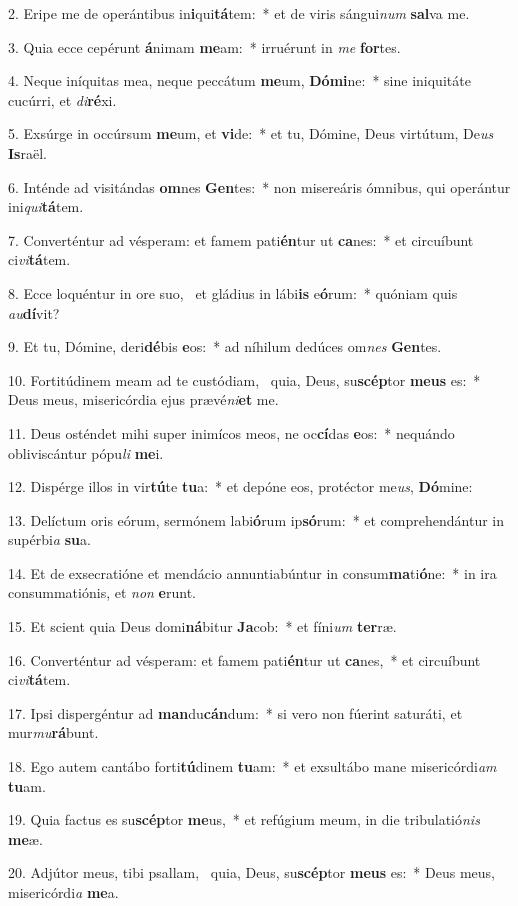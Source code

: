 2. Eripe me de operántibus in\textbf{i}qui\textbf{tá}tem:~*  et de viris sángui\textit{num} \textbf{sal}va me.\

3. Quia ecce cepérunt \textbf{á}nimam \textbf{me}am:~*  irruérunt in \textit{me} \textbf{for}tes.\

4. Neque iníquitas mea, neque peccátum \textbf{me}um, \textbf{Dó}\textbf{mi}ne:~*  sine iniquitáte cucúrri, et \textit{di}\textbf{ré}xi.\

5. Exsúrge in occúrsum \textbf{me}um, et \textbf{vi}de:~*  et tu, Dómine, Deus virtútum, De\textit{us} \textbf{Is}raël.\

6. Inténde ad visitándas \textbf{om}nes \textbf{Gen}tes:~*  non misereáris ómnibus, qui operántur ini\textit{qui}\textbf{tá}tem.\

7. Converténtur ad vésperam: et famem pati\textbf{én}tur ut \textbf{ca}nes:~*  et circuíbunt ci\textit{vi}\textbf{tá}tem.\

8. Ecce loquéntur in ore suo, \dag\  et gládius in lábi\textbf{is} e\textbf{ó}rum:~*  quóniam quis \textit{au}\textbf{dí}vit?\

9. Et tu, Dómine, deri\textbf{dé}bis \textbf{e}os:~*  ad níhilum dedúces om\textit{nes} \textbf{Gen}tes.\

10. Fortitúdinem meam ad te custódiam, \dag\  quia, Deus, su\textbf{scép}tor \textbf{me}\textbf{us} es:~*  Deus meus, misericórdia ejus prævé\textit{ni}\textbf{et} me.\

11. Deus osténdet mihi super inimícos meos, ne oc\textbf{cí}das \textbf{e}os:~*  nequándo obliviscántur pópu\textit{li} \textbf{me}i.\

12. Dispérge illos in vir\textbf{tú}te \textbf{tu}a:~*  et depóne eos, protéctor me\textit{us}, \textbf{Dó}mine:\

13. Delíctum oris eórum, sermónem labi\textbf{ó}rum ip\textbf{só}rum:~*  et comprehendántur in supérbi\textit{a} \textbf{su}a.\

14. Et de exsecratióne et mendácio annuntiabúntur in consum\textbf{ma}ti\textbf{ó}ne:~*  in ira consummatiónis, et \textit{non} \textbf{e}runt.\

15. Et scient quia Deus domi\textbf{ná}bitur \textbf{Ja}cob:~*  et fíni\textit{um} \textbf{ter}ræ.\

16. Converténtur ad vésperam: et famem pati\textbf{én}tur ut \textbf{ca}nes,~*  et circuíbunt ci\textit{vi}\textbf{tá}tem.\

17. Ipsi dispergéntur ad \textbf{man}du\textbf{cán}dum:~*  si vero non fúerint saturáti, et mur\textit{mu}\textbf{rá}bunt.\

18. Ego autem cantábo forti\textbf{tú}dinem \textbf{tu}am:~*  et exsultábo mane misericórdi\textit{am} \textbf{tu}am.\

19. Quia factus es su\textbf{scép}tor \textbf{me}us,~*  et refúgium meum, in die tribulatió\textit{nis} \textbf{me}æ.\

20. Adjútor meus, tibi psallam, \dag\  quia, Deus, su\textbf{scép}tor \textbf{me}\textbf{us} es:~*  Deus meus, misericórdi\textit{a} \textbf{me}a.\

